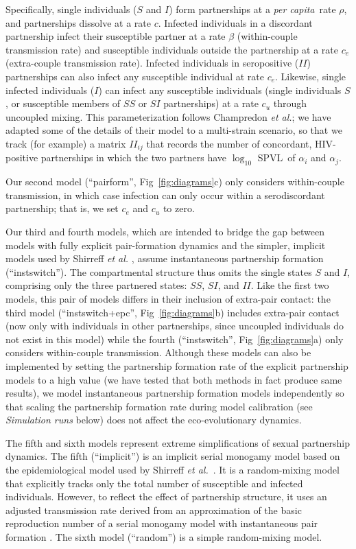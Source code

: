 \documentclass[10pt,letterpaper]{article}
\renewcommand{\figurename}{Fig}
\newcommand{\Lspvl}{$\log_{10}$ SPVL}
\newcommand{\etal}{\textit{et al.}}
\newcommand{\diagfig}[1]{\figurename~\ref{fig:diagrams}#1}
\newcommand{\percap}{\emph{per capita}}
\begin{document}
Specifically, single individuals ($S$ and $I$) form partnerships at a \percap\ rate $\rho$, and partnerships dissolve at a rate $c$. Infected individuals in a discordant partnership infect their susceptible partner at a rate $\beta$ (within-couple transmission rate) and susceptible individuals outside the partnership at a rate $c_e$ (extra-couple transmission rate). Infected individuals in seropositive ($II$) partnerships can also infect any susceptible individual at rate $c_e$. Likewise, single infected individuals ($I$) can infect any susceptible individuals (single individuals $S$, or susceptible members of $SS$ or $SI$ partnerships) at a rate $c_u$ through uncoupled mixing. 
This parameterization follows Champredon \etal; we have adapted some of the details
of their model to a multi-strain scenario, so that we track (for example) a matrix 
$II_{ij}$ that records the number of concordant, HIV-positive partnerships in which the two partners have \Lspvl\ of $\alpha_i$ and $\alpha_j$. 

Our second model (``pairform'', \diagfig{c}) only considers within-couple transmission, in which case infection can only occur within a serodiscordant partnership; that is, we set $c_e$ and $c_u$ to zero.

Our third and fourth models, which are intended to bridge the gap between models with fully explicit pair-formation dynamics and the simpler, implicit models used by Shirreff \emph{et al.} \cite{shirreff_transmission_2011}, assume instantaneous partnership formation (``instswitch''). The compartmental structure thus omits the single states $S$ and $I$, comprising only the three partnered states: $SS$, $SI$, and $II$. Like the first two models, this pair of models differs in their inclusion of extra-pair contact: the third model (``instswitch+epc'', \diagfig{b}) includes extra-pair contact (now only with individuals in other partnerships, since uncoupled individuals do not exist in this model) while the fourth (``instswitch'', \diagfig{a}) only considers within-couple transmission. Although these models can also be implemented
by setting the partnership formation rate of the explicit partnership models to a high value (we have tested that both methods in fact produce same results), we model instantaneous partnership formation models independently so that scaling the partnership formation rate during model calibration (see \emph{Simulation runs} below) does not affect the eco-evolutionary dynamics.

The fifth and sixth models represent extreme simplifications of sexual partnership dynamics.  The fifth (``implicit'') is an implicit serial monogamy model based on the epidemiological model used by Shirreff \etal\ \cite{shirreff_transmission_2011}. It is a random-mixing model that explicitly tracks only the total number of susceptible and infected individuals. However, to reflect the effect of partnership structure, it uses an adjusted transmission rate derived from an approximation of the basic reproduction number of a serial monogamy model with instantaneous pair formation \cite{hollingsworth_hiv1_2008}. The sixth model (``random'') is a simple random-mixing model.
\end{document}
